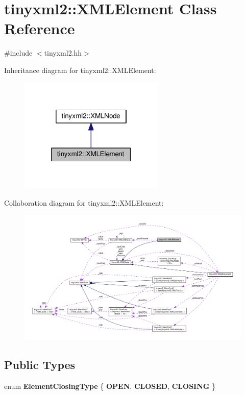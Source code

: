\hypertarget{classtinyxml2_1_1XMLElement}{}\section{tinyxml2\+:\+:X\+M\+L\+Element Class Reference}
\label{classtinyxml2_1_1XMLElement}


{\ttfamily \#include $<$tinyxml2.\+hh$>$}



Inheritance diagram for tinyxml2\+:\+:X\+M\+L\+Element\+:
\nopagebreak
\begin{figure}[H]
\begin{center}
\leavevmode
\includegraphics[width=196pt]{classtinyxml2_1_1XMLElement__inherit__graph}
\end{center}
\end{figure}


Collaboration diagram for tinyxml2\+:\+:X\+M\+L\+Element\+:
\nopagebreak
\begin{figure}[H]
\begin{center}
\leavevmode
\includegraphics[width=350pt]{classtinyxml2_1_1XMLElement__coll__graph}
\end{center}
\end{figure}
\subsection*{Public Types}
\begin{DoxyCompactItemize}
\item 
enum {\bfseries Element\+Closing\+Type} \{ {\bfseries O\+P\+EN}, 
{\bfseries C\+L\+O\+S\+ED}, 
{\bfseries C\+L\+O\+S\+I\+NG}
 \}\hypertarget{classtinyxml2_1_1XMLElement_ab5f90e2493c35702175235127e2935b4}{}\label{classtinyxml2_1_1XMLElement_ab5f90e2493c35702175235127e2935b4}

\end{DoxyCompactItemize}
